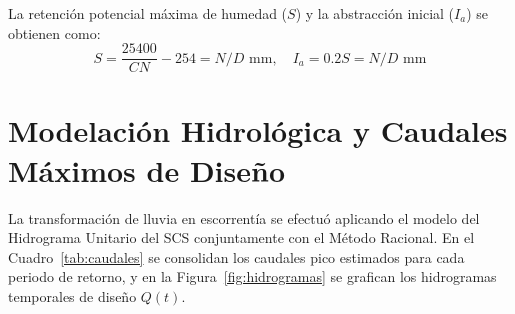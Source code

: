 \documentclass[11pt,a4paper]{article}
\begin{document}
\begin{table}[H]
\centering
\caption{Cálculo del Número de Curva (CN) por unidades homogéneas de la cuenca.}
\label{tab:cn}
\end{table}

La retención potencial máxima de humedad ($S$) y la abstracción inicial ($I_a$) se obtienen como:
\begin{equation}
S = \frac{25400}{CN} - 254 = N/D \text{ mm}, \quad I_a = 0.2 S = N/D \text{ mm}
\end{equation}



\section{Modelación Hidrológica y Caudales Máximos de Diseño}
La transformación de lluvia en escorrentía se efectuó aplicando el modelo del Hidrograma Unitario del SCS conjuntamente con el Método Racional. En el Cuadro~\ref{tab:caudales} se consolidan los caudales pico estimados para cada periodo de retorno, y en la Figura~\ref{fig:hidrogramas} se grafican los hidrogramas temporales de diseño $Q(t)$.

\begin{table}[H]
\centering
\caption{Resumen de caudales pico obtenidos para diferentes periodos de retorno.}
\label{tab:caudales}
\end{table}
\end{document}
